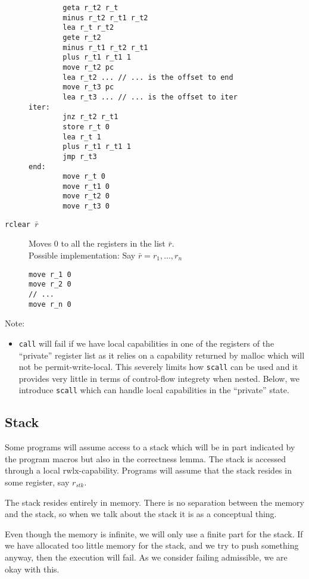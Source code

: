 \documentclass[a4paper]{article}
\newcommand{\var}[1]{\mathit{#1}}
\newcommand{\plainperm}[1]{\mathrm{#1}}
\newcommand{\rwlx}{\plainperm{rwlx}}
\begin{document}
\begin{description}
\begin{lstlisting}
        geta r_t2 r_t
        minus r_t2 r_t1 r_t2
        lea r_t r_t2
        gete r_t2
        minus r_t1 r_t2 r_t1
        plus r_t1 r_t1 1
        move r_t2 pc
        lea r_t2 ... // ... is the offset to end
        move r_t3 pc
        lea r_t3 ... // ... is the offset to iter
iter:
        jnz r_t2 r_t1
        store r_t 0
        lea r_t 1
        plus r_t1 r_t1 1
        jmp r_t3
end:
        move r_t 0
        move r_t1 0
        move r_t2 0
        move r_t3 0
\end{lstlisting}
              \item[\texttt{rclear $\bar{r}$}] Moves 0 to all the registers in the list $\bar{r}$.\\
Possible implementation: Say $\bar{r} = r_1,\dots, r_n$
\begin{lstlisting}
move r_1 0
move r_2 0
// ...
move r_n 0
\end{lstlisting}

\end{description}
Note:
\begin{itemize}
\item \texttt{call} will fail if we have local capabilities in one of the registers of the ``private'' register list as it relies on a capability returned by malloc which will not be permit-write-local. This severely limits how \texttt{scall} can be used and it provides very little in terms of control-flow integrety when nested. Below, we introduce \texttt{scall} which can handle local capabilities in the ``private'' state. 
\end{itemize}
\subsection{Stack}
Some programs will assume access to a stack which will be in part indicated by the program macros but also in the correctness lemma. The stack is accessed through a local $\rwlx$-capability. Programs will assume that the stack resides in some register, say $r_{\var{stk}}$.

The stack resides entirely in memory. There is no separation between the memory and the stack, so when we talk about the stack it is as a conceptual thing. %

Even though the memory is infinite, we will only use a finite part for the stack. If we have allocated too little memory for the stack, and we try to push something anyway, then the execution will fail. As we consider failing admissible, we are okay with this. 
\end{document}
